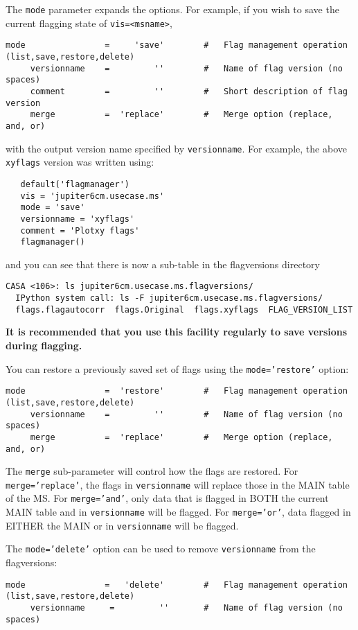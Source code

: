 The {\tt mode} parameter expands the options.  For example, if you wish to 
save the current flagging state of {\tt vis=<msname>}, 
\small
\begin{verbatim}
mode                =     'save'        #   Flag management operation (list,save,restore,delete)
     versionname    =         ''        #   Name of flag version (no spaces)
     comment        =         ''        #   Short description of flag version
     merge          =  'replace'        #   Merge option (replace, and, or)
\end{verbatim}
\normalsize
with the output version name specified by {\tt versionname}.  For example, the
above {\tt xyflags} version was written using:
\small
\begin{verbatim}
   default('flagmanager')
   vis = 'jupiter6cm.usecase.ms'
   mode = 'save'
   versionname = 'xyflags'
   comment = 'Plotxy flags'
   flagmanager()
\end{verbatim}
\normalsize
and you can see that there is now a sub-table in the flagversions directory
\small
\begin{verbatim}
CASA <106>: ls jupiter6cm.usecase.ms.flagversions/
  IPython system call: ls -F jupiter6cm.usecase.ms.flagversions/
  flags.flagautocorr  flags.Original  flags.xyflags  FLAG_VERSION_LIST
\end{verbatim}

\normalsize
{\bf It is recommended that you use this facility regularly to save versions
during flagging.}

You can restore a previously saved set of flags using the 
{\tt mode='restore'} option:
\small
\begin{verbatim}
mode                =  'restore'        #   Flag management operation (list,save,restore,delete)
     versionname    =         ''        #   Name of flag version (no spaces)
     merge          =  'replace'        #   Merge option (replace, and, or)
\end{verbatim}
\normalsize
The {\tt merge} sub-parameter will control how the flags are restored.  
For {\tt merge='replace'}, the flags in {\tt versionname} will replace those
in the MAIN table of the MS.  For {\tt merge='and'}, only data that is
flagged in BOTH the current MAIN table and in {\tt versionname} will 
be flagged.  For {\tt merge='or'}, data flagged in EITHER the MAIN or
in {\tt versionname} will be flagged.

The {\tt mode='delete'} option can be used to remove {\tt versionname} from the
flagversions:
\small
\begin{verbatim}
mode                =   'delete'        #   Flag management operation (list,save,restore,delete)
     versionname     =         ''       #   Name of flag version (no spaces)
\end{verbatim}
\normalsize

